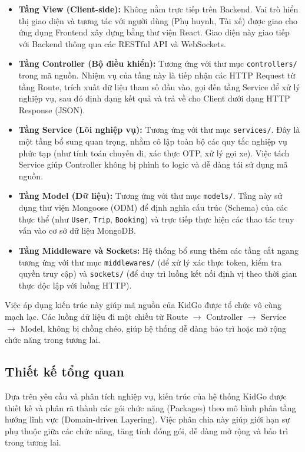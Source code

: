 \documentclass[../DoAn.tex]{subfiles}
\begin{document}
\begin{itemize}
    \item \textbf{Tầng View (Client-side):} Không nằm trực tiếp trên Backend. Vai trò hiển thị giao diện và tương tác với người dùng (Phụ huynh, Tài xế) được giao cho ứng dụng Frontend xây dựng bằng thư viện React. Giao diện này giao tiếp với Backend thông qua các RESTful API và WebSockets.
    \item \textbf{Tầng Controller (Bộ điều khiển):} Tương ứng với thư mục \texttt{controllers/} trong mã nguồn. Nhiệm vụ của tầng này là tiếp nhận các HTTP Request từ tầng Route, trích xuất dữ liệu tham số đầu vào, gọi đến tầng Service để xử lý nghiệp vụ, sau đó định dạng kết quả và trả về cho Client dưới dạng HTTP Response (JSON).
    \item \textbf{Tầng Service (Lõi nghiệp vụ):} Tương ứng với thư mục \texttt{services/}. Đây là một tầng bổ sung quan trọng, nhằm cô lập toàn bộ các quy tắc nghiệp vụ phức tạp (như tính toán chuyến đi, xác thực OTP, xử lý gọi xe). Việc tách Service giúp Controller không bị phình to logic và dễ dàng tái sử dụng mã nguồn.
    \item \textbf{Tầng Model (Dữ liệu):} Tương ứng với thư mục \texttt{models/}. Tầng này sử dụng thư viện Mongoose (ODM) để định nghĩa cấu trúc (Schema) của các thực thể (như \texttt{User}, \texttt{Trip}, \texttt{Booking}) và trực tiếp thực hiện các thao tác truy vấn vào cơ sở dữ liệu MongoDB.
    \item \textbf{Tầng Middleware và Sockets:} Hệ thống bổ sung thêm các tầng cắt ngang tương ứng với thư mục \texttt{middlewares/} (để xử lý xác thực token, kiểm tra quyền truy cập) và \texttt{sockets/} (để duy trì luồng kết nối định vị theo thời gian thực độc lập với luồng HTTP).
\end{itemize}

Việc áp dụng kiến trúc này giúp mã nguồn của KidGo được tổ chức vô cùng mạch lạc. Các luồng dữ liệu đi một chiều từ Route $\rightarrow$ Controller $\rightarrow$ Service $\rightarrow$ Model, không bị chồng chéo, giúp hệ thống dễ dàng bảo trì hoặc mở rộng chức năng trong tương lai.

\subsection{Thiết kế tổng quan}
Dựa trên yêu cầu và phân tích nghiệp vụ, kiến trúc của hệ thống KidGo được thiết kế và phân rã thành các gói chức năng (Packages) theo mô hình phân tầng hướng lĩnh vực (Domain-driven Layering). Việc phân chia này giúp giới hạn sự phụ thuộc giữa các chức năng, tăng tính đóng gói, dễ dàng mở rộng và bảo trì trong tương lai.
\end{document}
